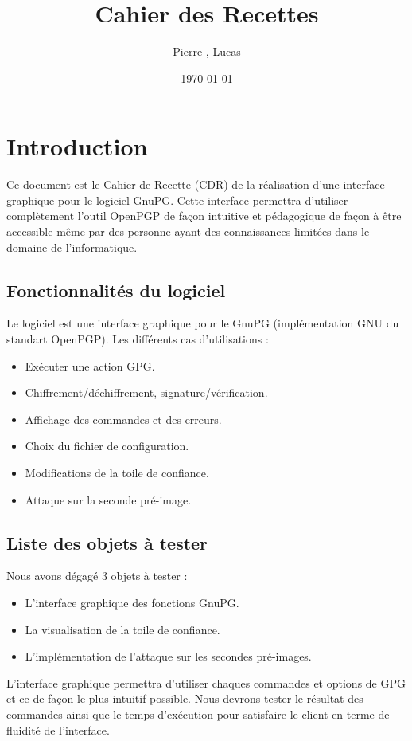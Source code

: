 \documentclass{../res/univ-projet}
\title{Cahier des Recettes}
\author{Pierre \bsc{Balmelle}, Lucas \bsc{Barbay}}
\date{\today}
\begin{document}
\maketitle
\newpage
\tableofcontents
\newpage

\section{Introduction}

Ce document est le Cahier de Recette (CDR) de la réalisation d'une interface graphique pour le logiciel GnuPG.
Cette interface permettra d'utiliser complètement l'outil OpenPGP de façon intuitive et pédagogique de façon 
à être accessible même par des personne ayant des connaissances limitées dans le domaine de l'informatique. 

\subsection{Fonctionnalités du logiciel}
Le logiciel est une interface graphique pour le GnuPG (implémentation GNU du standart OpenPGP).
Les différents cas d'utilisations :
\begin{itemize}
 \item Exécuter une action GPG.
 \item Chiffrement/déchiffrement, signature/vérification.
 \item Affichage des commandes et des erreurs.
 \item Choix du fichier de configuration.
 \item Modifications de la toile de confiance.
 \item Attaque sur la seconde pré-image.
\end{itemize}

\subsection{Liste des objets à tester}
Nous avons dégagé 3 objets à tester : 
\begin{itemize}
 \item L'interface graphique des fonctions GnuPG.
 \item La visualisation de la toile de confiance.
 \item L'implémentation de l'attaque sur les secondes pré-images. 
\end{itemize}

L'interface graphique permettra d'utiliser chaques commandes et options de GPG et ce de façon le plus intuitif possible. Nous
devrons tester le résultat des commandes ainsi que le temps d'exécution pour satisfaire le client en terme de fluidité de l'interface.
\end{document}
